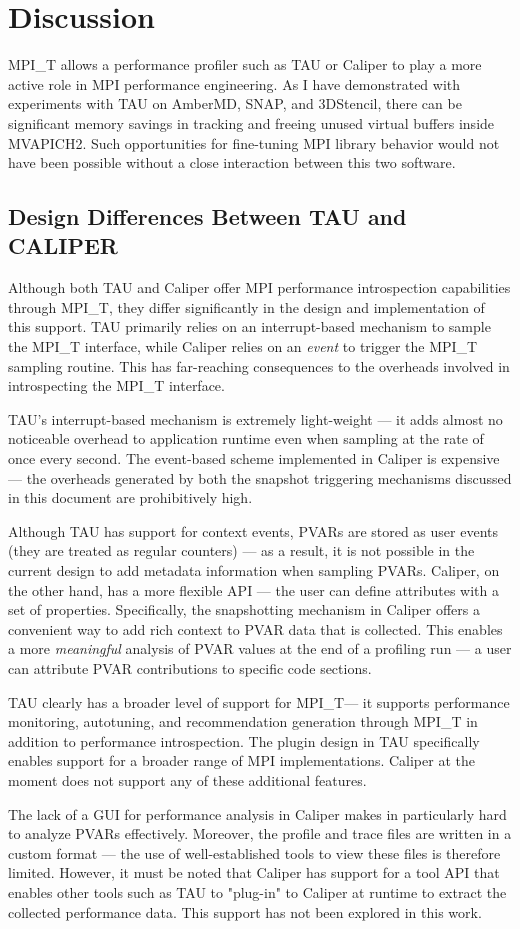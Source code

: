 \chapter{Discussion}

MPI\_T allows a performance profiler such as TAU or Caliper to play a more active role in MPI performance engineering. As I have demonstrated with experiments with TAU on AmberMD, SNAP, and 3DStencil, there can be significant memory savings in tracking and freeing unused virtual buffers inside MVAPICH2. Such opportunities for fine-tuning MPI library behavior would not have been possible without a close interaction between this two software.
\section{Design Differences Between TAU and CALIPER}
\par Although both TAU and Caliper offer MPI performance introspection capabilities through MPI\_T, they differ significantly in the design and implementation of this support. TAU primarily relies on an interrupt-based mechanism to sample the MPI\_T interface, while Caliper relies on an \textit{event} to trigger the MPI\_T sampling routine. This has far-reaching consequences to the overheads involved in introspecting the MPI\_T interface. 
\par TAU's interrupt-based mechanism is extremely light-weight --- it adds almost no noticeable overhead to application runtime even when sampling at the rate of once every second. The event-based scheme implemented in Caliper is expensive --- the overheads generated by both the snapshot triggering mechanisms discussed in this document are prohibitively high. 
\par Although TAU has support for context events, PVARs are stored as user events (they are treated as regular counters) --- as a result, it is not possible in the current design to add metadata information when sampling PVARs. Caliper, on the other hand, has a more flexible API --- the user can define attributes with a set of properties. Specifically, the snapshotting mechanism in Caliper offers a convenient way to add rich context to PVAR data that is collected. This enables a more \textit{meaningful} analysis of PVAR values at the end of a profiling run --- a user can attribute PVAR contributions to specific code sections.
\par TAU clearly has a broader level of support for MPI\_T--- it supports performance monitoring, autotuning, and recommendation generation through MPI\_T in addition to performance introspection. The plugin design in TAU specifically enables support for a broader range of MPI implementations. Caliper at the moment does not support any of these additional features. 
\par The lack of a GUI for performance analysis in Caliper makes in particularly hard to analyze PVARs effectively. Moreover, the profile and trace files are written in a custom format --- the use of well-established tools to view these files is therefore limited. However, it must be noted that Caliper has support for a tool API that enables other tools such as TAU to "plug-in" to Caliper at runtime to extract the collected performance data. This support has not been explored in this work.
